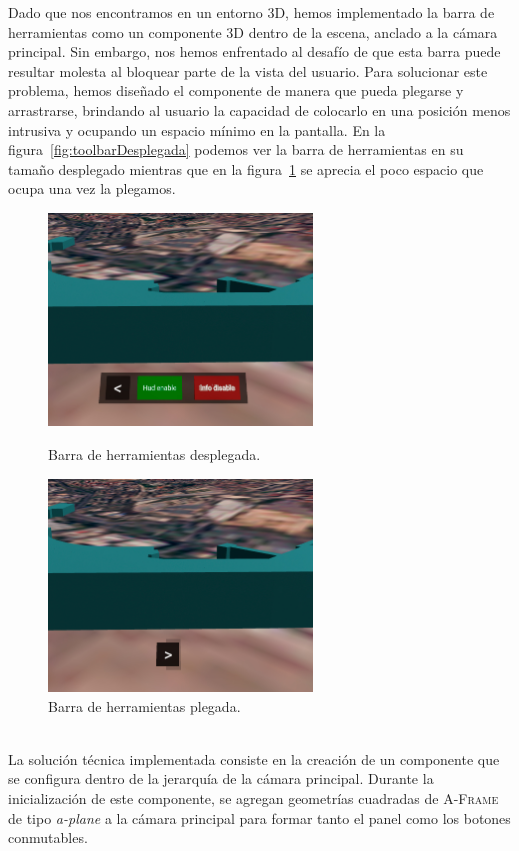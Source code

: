 \documentclass[a4paper, 11pt]{book}
\begin{document}
Dado que nos encontramos en un entorno 3D, hemos implementado la barra de herramientas como un componente 3D dentro de la escena, anclado a la cámara principal. Sin embargo, nos hemos enfrentado al desafío de que esta barra puede resultar molesta al bloquear parte de la vista del usuario. Para solucionar este problema, hemos diseñado el componente de manera que pueda plegarse y arrastrarse, brindando al usuario la capacidad de colocarlo en una posición menos intrusiva y ocupando un espacio mínimo en la pantalla.
En la figura~\ref{fig:toolbarDesplegada} podemos ver la barra de herramientas en su tamaño desplegado mientras que en la figura~\ref{fig:toolbarPlegada} se aprecia el poco espacio que ocupa una vez la plegamos.
\begin{figure}[h]
  \begin{minipage}[t]{0.5\linewidth}
    \centering
    \includegraphics[width=7cm, keepaspectratio]{img/toolbarAbierta.jpg}
    \caption{Barra de herramientas desplegada.}
    \label{fig:toolbarDesplegada}
  \end{minipage}%
  \begin{minipage}[t]{0.5\linewidth}
    \centering
    \includegraphics[width=7cm, keepaspectratio]{img/toolbarPlegada.jpg}
    \caption{Barra de herramientas plegada.}
    \label{fig:toolbarPlegada}    
  \end{minipage}
\end{figure}
\\La solución técnica implementada consiste en la creación de un componente que se configura dentro de la jerarquía de la cámara principal. Durante la inicialización de este componente, se agregan geometrías cuadradas de \textsc{A-Frame} de tipo \emph{a-plane} a la cámara principal para formar tanto el panel como los botones conmutables. 
\end{document}
